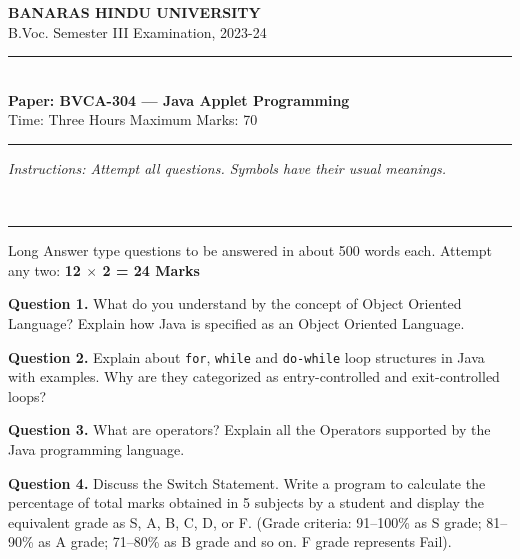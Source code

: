 \documentclass[11pt,a4paper]{article}
\begin{document}
\begin{center}
  {\large\bfseries BANARAS HINDU UNIVERSITY}\\[2pt]
  {
\normalsize B.Voc. Semester III Examination, 2023-24}\\[6pt]
  \rule{0.8\linewidth}{0.5pt}\\[6pt]
  {\large\bfseries Paper: BVCA-304 --- Java Applet Programming}\\[4pt]
  {
\normalsize Time: Three Hours \hfill Maximum Marks: 70}
\end{center}

\rule{\linewidth}{0.4pt}

\smallskip



\noindent   \textit{Instructions: Attempt all questions. Symbols have their usual meanings.}

\bigskip




\\[4pt]
\rule{\linewidth}{0.4pt}\smallskip

Long Answer type questions to be answered in about 500 words each. Attempt any two: \hfill   \textbf{12 $ \times$ 2 = 24 Marks}

\medskip



\noindent   \textbf{Question 1.} What do you understand by the concept of Object Oriented Language? Explain how Java is specified as an Object Oriented Language.

\medskip



\noindent   \textbf{Question 2.} Explain about   \texttt{for},   \texttt{while} and   \texttt{do-while} loop structures in Java with examples. Why are they categorized as entry-controlled and exit-controlled loops?

\medskip



\noindent   \textbf{Question 3.} What are operators? Explain all the Operators supported by the Java programming language.

\medskip



\noindent   \textbf{Question 4.} Discuss the Switch Statement. Write a program to calculate the percentage of total marks obtained in 5 subjects by a student and display the equivalent grade as S, A, B, C, D, or F. (Grade criteria: 91--100\% as S grade; 81--90\% as A grade; 71--80\% as B grade and so on. F grade represents Fail).
\end{document}
